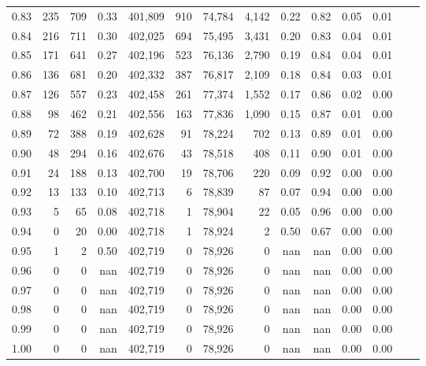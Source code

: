 \begin{tabular}{rrrrrrrrrrrrrr}
0.83 &     235 &    709 &    0.33 &  401,809 &      910 &  74,784 &   4,142 &  0.22 &  0.82 &  0.05 &      0.01 \\
0.84 &     216 &    711 &    0.30 &  402,025 &      694 &  75,495 &   3,431 &  0.20 &  0.83 &  0.04 &      0.01 \\
0.85 &     171 &    641 &    0.27 &  402,196 &      523 &  76,136 &   2,790 &  0.19 &  0.84 &  0.04 &      0.01 \\
0.86 &     136 &    681 &    0.20 &  402,332 &      387 &  76,817 &   2,109 &  0.18 &  0.84 &  0.03 &      0.01 \\
0.87 &     126 &    557 &    0.23 &  402,458 &      261 &  77,374 &   1,552 &  0.17 &  0.86 &  0.02 &      0.00 \\
0.88 &      98 &    462 &    0.21 &  402,556 &      163 &  77,836 &   1,090 &  0.15 &  0.87 &  0.01 &      0.00 \\
0.89 &      72 &    388 &    0.19 &  402,628 &       91 &  78,224 &     702 &  0.13 &  0.89 &  0.01 &      0.00 \\
0.90 &      48 &    294 &    0.16 &  402,676 &       43 &  78,518 &     408 &  0.11 &  0.90 &  0.01 &      0.00 \\
0.91 &      24 &    188 &    0.13 &  402,700 &       19 &  78,706 &     220 &  0.09 &  0.92 &  0.00 &      0.00 \\
0.92 &      13 &    133 &    0.10 &  402,713 &        6 &  78,839 &      87 &  0.07 &  0.94 &  0.00 &      0.00 \\
0.93 &       5 &     65 &    0.08 &  402,718 &        1 &  78,904 &      22 &  0.05 &  0.96 &  0.00 &      0.00 \\
0.94 &       0 &     20 &    0.00 &  402,718 &        1 &  78,924 &       2 &  0.50 &  0.67 &  0.00 &      0.00 \\
0.95 &       1 &      2 &    0.50 &  402,719 &        0 &  78,926 &       0 &   nan &   nan &  0.00 &      0.00 \\
0.96 &       0 &      0 &     nan &  402,719 &        0 &  78,926 &       0 &   nan &   nan &  0.00 &      0.00 \\
0.97 &       0 &      0 &     nan &  402,719 &        0 &  78,926 &       0 &   nan &   nan &  0.00 &      0.00 \\
0.98 &       0 &      0 &     nan &  402,719 &        0 &  78,926 &       0 &   nan &   nan &  0.00 &      0.00 \\
0.99 &       0 &      0 &     nan &  402,719 &        0 &  78,926 &       0 &   nan &   nan &  0.00 &      0.00 \\
1.00 &       0 &      0 &     nan &  402,719 &        0 &  78,926 &       0 &   nan &   nan &  0.00 &      0.00 \\
\bottomrule
\end{tabular}
